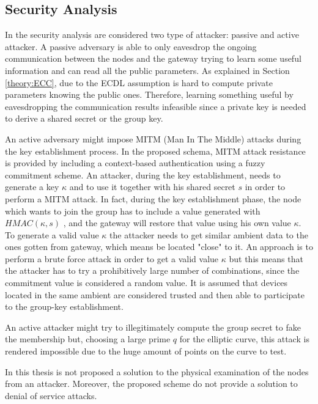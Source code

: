 \subsection{Security Analysis}
In the security analysis are considered two type of attacker: passive and active attacker.
A passive adversary is able to only eavesdrop the ongoing communication between the nodes and the gateway trying to learn some useful information and can read all the public parameters.
As explained in Section \ref{theory:ECC}, due to the ECDL assumption is hard to compute private parameters knowing the public ones.
Therefore, learning something useful by eavesdropping the communication results infeasible since a private key is needed to derive a shared secret or the group key.

An active adversary might impose MITM (Man In The Middle) attacks during the key establishment process.
In the proposed schema, MITM attack resistance is provided by including a context-based authentication using a fuzzy commitment scheme.
An attacker, during the key establishment, needs to generate a key $\kappa$ and to use it together with his shared secret $s$ in order to perform a MITM attack. 
In fact, during the key establishment phase, the node which wants to join the group has to include a value generated with $HMAC(\kappa , s)$ , and the gateway will restore that value using his own value $\kappa$.
To generate a valid value $\kappa$ the attacker needs to get similar ambient data to the ones gotten from gateway, which means be located "close" to it.
An approach is to perform a brute force attack in order to get a valid value $\kappa$ but this means that the attacker has to try a prohibitively large number of combinations, since the commitment value is considered a random value.
It is assumed that devices located in the same ambient are considered trusted and then able to participate to the group-key establishment. 

An active attacker might try to illegitimately compute the group secret to fake the membership but, choosing a large prime $q$ for the elliptic curve, this attack is rendered impossible due to the huge amount of points on the curve to test.

In this thesis is not proposed a solution to the physical examination of the nodes from an attacker.
Moreover, the proposed scheme do not provide a solution to denial of service attacks.



